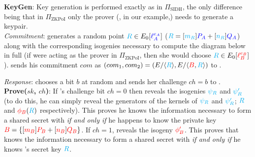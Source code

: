 \noindent
\textbf{KeyGen}: Key generation is performed exactly as in $\Pi_{\text{SIDH}}$, the only difference being that in $\Pi_{\text{ZKPoI}}$ only the prover (\bob, in our example,) needs to generate a keypair.\\

\noindent
\emph{Commitment}: \bob generates a random point $\textcolor{cyan}{R} \in E_0[\textcolor{blue}{\ell_{A}^{e_A}}]$ ($\textcolor{cyan}{R} = [\textcolor{cyan}{m_R}]\textcolor{blue}{P_A} + [\textcolor{cyan}{n_R}]\textcolor{blue}{Q_A}$) along with the corresponding isogenies necessary to compute the diagram below in full (if \alice were acting as the prover in $\Pi_{\text{ZKPoI}}$, then she would choose $\textcolor{cyan}{R} \in E_0[\textcolor{red}{\ell_{B}^{e_B}}]$). \bob sends his commitment $com$ as $(com_1,com_2) = (E/\langle \textcolor{cyan}{R} \rangle, E/\langle \textcolor{red}{B}, \textcolor{cyan}{R} \rangle)$ to \alice.\\

\begin{center}
\end{center}

\noindent
\emph{Response}: \alice chooses a bit $b$ at random and sends her challenge $ch = b$ to \bob.\\

\noindent
\textbf{Prove($sk$, $ch$)}: If \alice's challenge bit $ch = 0$ then \bob reveals the isogenies $\textcolor{cyan}{\psi_R}$ and $\textcolor{cyan}{\psi'_R}$ (to do this, he can simply reveal the generators of the kernels of $\textcolor{cyan}{\psi_R}$ and $\textcolor{cyan}{\psi'_R}$; $\textcolor{cyan}{R}$ and $\textcolor{red}{\phi_B}(\textcolor{cyan}{R})$ respectively). This proves he knows the information necessary to form a shared secret with \randall \emph{if and only if} he happens to know the private key $\textcolor{red}{B} = \{[\textcolor{red}{m_B}]\textcolor{red}{P_B} + [\textcolor{red}{n_B}]\textcolor{red}{Q_B}\}$. If $ch = 1$, \bob reveals the isogeny $\textcolor{red}{\phi'_B}$. This proves that \bob knows the information necessary to form a shared secret with \randall \emph{if and only if} he knows \randall's secret key $\textcolor{cyan}{R}$.\\

